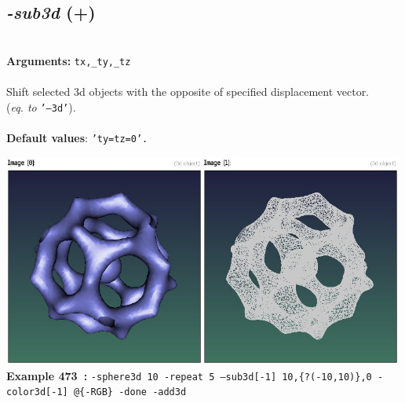 \documentclass[a4paper,11pt,twoside]{book}
\begin{document}
\subsection{\emph{-sub3d} (+)}\vspace*{-0.5em}
~\\\textbf{Arguments: } 
{\small \texttt{tx,\_ty,\_tz}}\\~\\
Shift selected 3d objects with the opposite of specified displacement vector.
~\\(\emph{eq. to} {\small \texttt{'--3d'}}).
~\\~\\\textbf{Default values}: {\small \texttt{'ty=tz=0'.}}
\begin{center}\includegraphics[keepaspectratio=true,height=7cm,width=\textwidth]{img/gmic_def473.jpg}\\
{\footnotesize \textbf{Example 473~:} \texttt{-sphere3d 10 -repeat 5 --sub3d[-1] 10,\{?(-10,10)\},0 -color3d[-1] @\{-RGB\} -done -add3d}}
\end{center}
\end{document}
